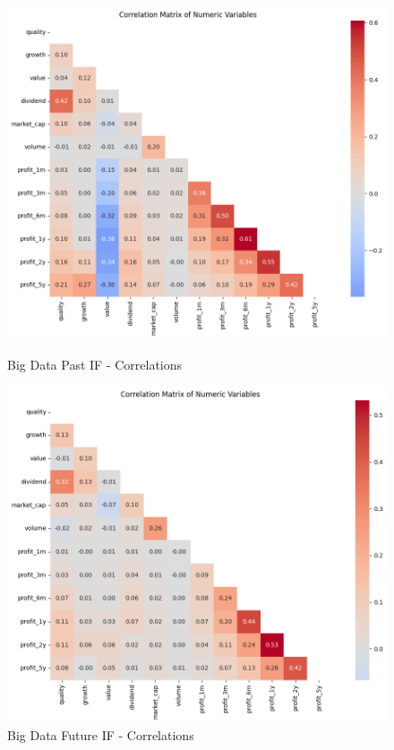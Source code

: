 \documentclass[11pt,english,a4paper,hidelinks]{book}
\begin{document}
\begin{figure}[H]
    \centering
    \begin{minipage}{0.48\textwidth}
        \centering
        \includegraphics[width=\linewidth]{images/code/descriptive analysis/correlations/Big Data Past - IF.png}
        \caption{Big Data Past IF - Correlations}
        \label{fig:big_data_past_if_correlations}
    \end{minipage}\hfill
    \begin{minipage}{0.48\textwidth}
        \centering
        \includegraphics[width=\linewidth]{images/code/descriptive analysis/correlations/Big Data future - IF.png}
        \caption{Big Data Future IF - Correlations}
        \label{fig:big_data_future_if_correlations}
    \end{minipage}
\end{figure}
\end{document}
